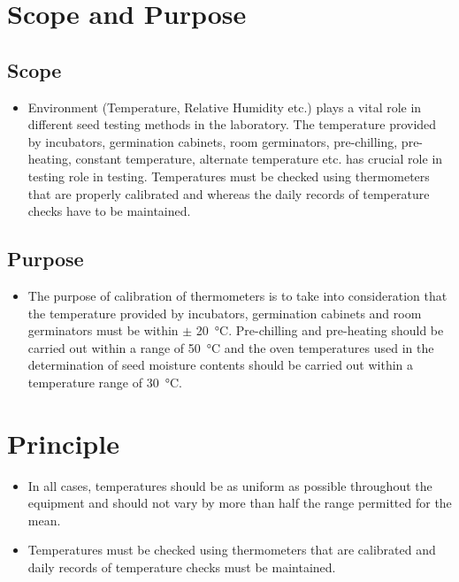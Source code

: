 \documentclass[]{book}
\providecommand{\tightlist}{%
  \setlength{\itemsep}{0pt}\setlength{\parskip}{0pt}}
\begin{document}
\section{Scope and Purpose}\label{scope-and-purpose-2}

\subsection{Scope}\label{scope-3}

\begin{itemize}
\tightlist
\item
  Environment (Temperature, Relative Humidity etc.) plays a vital role
  in different seed testing methods in the laboratory. The temperature
  provided by incubators, germination cabinets, room germinators,
  pre-chilling, pre-heating, constant temperature, alternate temperature
  etc. has crucial role in testing role in testing. Temperatures must be
  checked using thermometers that are properly calibrated and whereas
  the daily records of temperature checks have to be maintained.
\end{itemize}

\subsection{Purpose}\label{purpose-1}

\begin{itemize}
\tightlist
\item
  The purpose of calibration of thermometers is to take into
  consideration that the temperature provided by incubators, germination
  cabinets and room germinators must be within \(\pm\)
  \SI{20}{\celsius}. Pre-chilling and pre-heating should be carried out
  within a range of \SI{50}{\celsius} and the oven temperatures used in
  the determination of seed moisture contents should be carried out
  within a temperature range of \SI{30}{\celsius}.
\end{itemize}

\section{Principle}\label{principle-2}

\begin{itemize}
\tightlist
\item
  In all cases, temperatures should be as uniform as possible throughout
  the equipment and should not vary by more than half the range
  permitted for the mean.
\item
  Temperatures must be checked using thermometers that are calibrated
  and daily records of temperature checks must be maintained.
\end{itemize}
\end{document}
